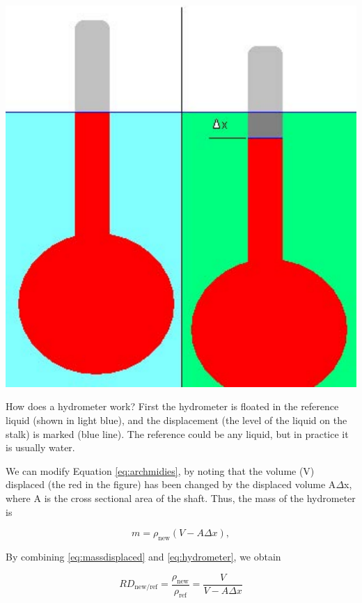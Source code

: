 \documentclass{tufte-handout}
\begin{document}
\begin{marginfigure}
		\includegraphics{Hydro.pdf}
	\caption{How does a hydrometer work? First the hydrometer is floated in the reference liquid (shown in light blue), and the displacement (the level of the liquid on the stalk) is marked (blue line). The reference could be any liquid, but in practice it is usually water. }
	\label{fig:Hydro}
\end{marginfigure}

We can modify Equation \ref{eq:archmidies}, by noting that the volume (V) displaced (the red in the figure) has been changed by the displaced volume A$\Delta$x, where A is the cross sectional area of the shaft. Thus, the mass of the hydrometer is 

\begin{equation}\label{eq:hydrometer}
m = \rho_\mathrm{new} (V - A \Delta x),
\end{equation}

\noindent By combining \ref{eq:massdisplaced} and \ref{eq:hydrometer}, we obtain

\begin{equation}\label{eq:RD1}
RD_{\mathrm{new/ref}} = \frac{\rho_\mathrm{new}}{\rho_\mathrm{ref}} = \frac{V}{V - A \Delta x}
\end{equation}
\end{document}
